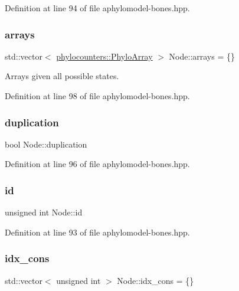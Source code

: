 Definition at line 94 of file aphylomodel-\/bones.\+hpp.

\mbox{\label{class_node_a269d78db10090d106c697d7c73bac9c7}} 
\subsubsection{\texorpdfstring{arrays}{arrays}}
{\footnotesize\ttfamily std\+::vector$<$ \hyperlink{namespacebarry_1_1counters_1_1phylo_abd293bf65e494e903639fb5fb2c91604}{phylocounters\+::\+Phylo\+Array} $>$ Node\+::arrays = \{\}}



Arrays given all possible states. 



Definition at line 98 of file aphylomodel-\/bones.\+hpp.

\mbox{\label{class_node_a3129939e8a58c055cb5ad8db8be6b10a}} 
\subsubsection{\texorpdfstring{duplication}{duplication}}
{\footnotesize\ttfamily bool Node\+::duplication}



Definition at line 96 of file aphylomodel-\/bones.\+hpp.

\mbox{\label{class_node_adb90577d9d796c4ccbccf41ce2efc6c9}} 
\subsubsection{\texorpdfstring{id}{id}}
{\footnotesize\ttfamily unsigned int Node\+::id}



Definition at line 93 of file aphylomodel-\/bones.\+hpp.

\mbox{\label{class_node_a95fa1b71d6c1a8cf155520c6d974d540}} 
\subsubsection{\texorpdfstring{idx\+\_\+cons}{idx\_cons}}
{\footnotesize\ttfamily std\+::vector$<$ unsigned int $>$ Node\+::idx\+\_\+cons = \{\}}



